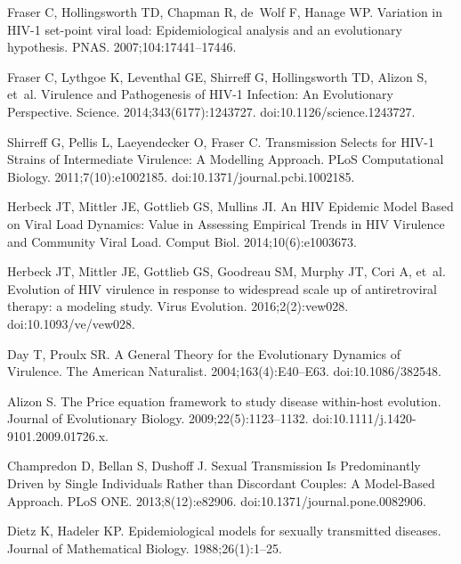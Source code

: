 \documentclass[10pt,letterpaper]{article}
\begin{document}
\begin{thebibliography}{10}
Fraser C, Hollingsworth TD, Chapman R, de~Wolf F, Hanage WP.
\newblock Variation in {HIV}-1 set-point viral load: Epidemiological analysis
  and an evolutionary hypothesis.
\newblock PNAS. 2007;104:17441--17446.

Fraser C, Lythgoe K, Leventhal GE, Shirreff G, Hollingsworth TD, Alizon S,
  et~al.
\newblock Virulence and Pathogenesis of {HIV}-1 Infection: An Evolutionary
  Perspective.
\newblock Science. 2014;343(6177):1243727.
\newblock doi:{10.1126/science.1243727}.

Shirreff G, Pellis L, Laeyendecker O, Fraser C.
\newblock Transmission Selects for {HIV-1} Strains of Intermediate Virulence: A
  Modelling Approach.
\newblock PLoS Computational Biology. 2011;7(10):e1002185.
\newblock doi:{10.1371/journal.pcbi.1002185}.

Herbeck JT, Mittler JE, Gottlieb GS, Mullins JI.
\newblock An {HIV} Epidemic Model Based on Viral Load Dynamics: Value in
  Assessing Empirical Trends in {HIV} Virulence and Community Viral Load.
 Comput Biol. 2014;10(6):e1003673.

Herbeck JT, Mittler JE, Gottlieb GS, Goodreau SM, Murphy JT, Cori A, et~al.
\newblock Evolution of {HIV} virulence in response to widespread scale up of
  antiretroviral therapy: a modeling study.
\newblock Virus Evolution. 2016;2(2):vew028.
\newblock doi:{10.1093/ve/vew028}.

Day T, Proulx SR.
\newblock A General Theory for the Evolutionary Dynamics of Virulence.
\newblock The American Naturalist. 2004;163(4):E40--E63.
\newblock doi:{10.1086/382548}.

Alizon S.
\newblock The {Price} equation framework to study disease within-host
  evolution.
\newblock Journal of Evolutionary Biology. 2009;22(5):1123--1132.
\newblock doi:{10.1111/j.1420-9101.2009.01726.x}.

Champredon D, Bellan S, Dushoff J.
 Sexual Transmission Is Predominantly Driven by Single
  Individuals Rather than Discordant Couples: A Model-Based Approach.
\newblock PLoS ONE. 2013;8(12):e82906.
\newblock doi:{10.1371/journal.pone.0082906}.

Dietz K, Hadeler KP.
\newblock Epidemiological models for sexually transmitted diseases.
\newblock Journal of Mathematical Biology. 1988;26(1):1--25.


\end{thebibliography}
\end{document}
